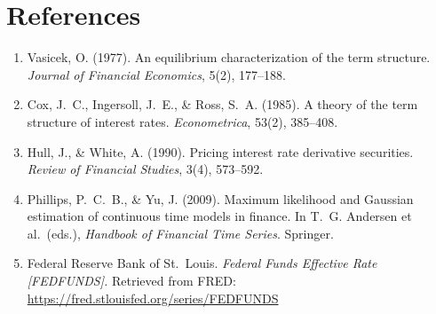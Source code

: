 \documentclass[11pt, letterpaper]{article}
\begin{document}
\section{References}

\begin{enumerate}
  \item Vasicek, O. (1977). An equilibrium characterization of the term
        structure. \textit{Journal of Financial Economics}, 5(2), 177--188.

  \item Cox, J.~C., Ingersoll, J.~E., \& Ross, S.~A. (1985). A theory of the
        term structure of interest rates. \textit{Econometrica}, 53(2), 385--408.

  \item Hull, J., \& White, A. (1990). Pricing interest rate derivative
        securities. \textit{Review of Financial Studies}, 3(4), 573--592.

  \item Phillips, P.~C.~B., \& Yu, J. (2009). Maximum likelihood and Gaussian
        estimation of continuous time models in finance. In T.~G. Andersen
        et al.\ (eds.), \textit{Handbook of Financial Time Series}. Springer.

  \item Federal Reserve Bank of St.\ Louis. \textit{Federal Funds Effective
        Rate [FEDFUNDS].} Retrieved from FRED:
        \url{https://fred.stlouisfed.org/series/FEDFUNDS}
\end{enumerate}
\end{document}
